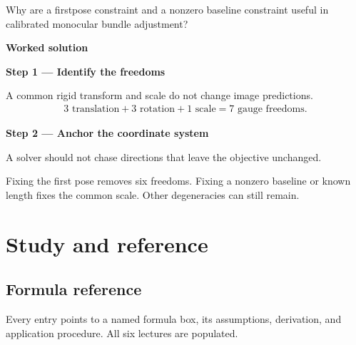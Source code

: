 \documentclass[letterpaper,11pt,english,openany,oneside]{jupyterBook}
\begin{document}
\sphinxAtStartPar
Why are a first\sphinxhyphen{}pose constraint and a nonzero baseline constraint useful in calibrated monocular bundle adjustment?

\par\medskip

\par\medskip
\textbf{Worked solution}\par\smallskip

\par\medskip{}
{\color{QuizStepRed}\bfseries Step 1 — Identify the freedoms}\par\smallskip

\sphinxAtStartPar
{} A common rigid transform and scale do not change image predictions.
{\color{QuizMathBlue} \begin{equation*}
\begin{split}3\text{ translation}+3\text{ rotation}+1\text{ scale}=7\text{ gauge freedoms}.\end{split}
\end{equation*}}
\par

\par\medskip{}
{\color{QuizStepRed}\bfseries Step 2 — Anchor the coordinate system}\par\smallskip

\sphinxAtStartPar
{} A solver should not chase directions that leave the objective unchanged.

\sphinxAtStartPar
Fixing the first pose removes six freedoms. Fixing a nonzero baseline or known length fixes the common scale. Other degeneracies can still remain.

\par

\par\medskip

\sphinxstepscope


\setcounter{secnumdepth}{-1}
\part*{Study and reference}

\sphinxstepscope


\chapter{Formula reference}
\label{\detokenize{reference/formulas:formula-reference}}\label{\detokenize{reference/formulas:id1}}\label{\detokenize{reference/formulas::doc}}
\sphinxAtStartPar
Every entry points to a named formula box, its assumptions, derivation, and application procedure. All six lectures are populated.
\end{document}
